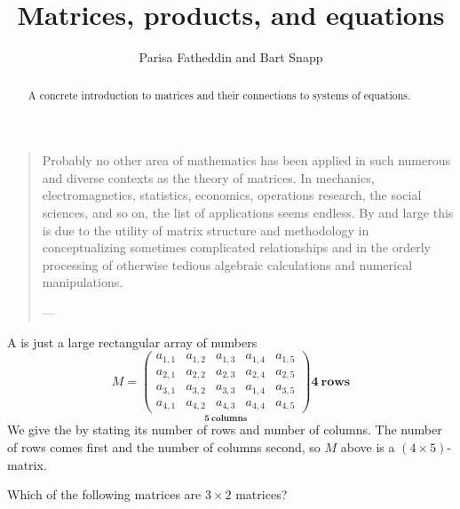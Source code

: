 \documentclass{ximera}
\author{Parisa Fatheddin and Bart Snapp}
\title{Matrices, products, and equations}
\begin{document}
\begin{abstract}
  A concrete introduction to matrices and their connections to systems
  of equations.
\end{abstract}
\maketitle

\begin{quote}
  Probably no other area of mathematics has been applied in such
  numerous and diverse contexts as the theory of matrices. In
  mechanics, electromagnetics, statistics, economics, operations
  research, the social sciences, and so on, the list of applications
  seems endless. By and large this is due to the utility of matrix
  structure and methodology in conceptualizing sometimes complicated
  relationships and in the orderly processing of otherwise tedious
  algebraic calculations and numerical manipulations.



  \hfill ---
\end{quote}




A  is just a large rectangular array of numbers
\[
M =
\underset{\displaystyle\boldsymbol{5}~\textbf{columns}}{\begin{pmatrix}
  a_{1,1} & a_{1,2} & a_{1,3} & a_{1,4} & a_{1,5} \\
  a_{2,1} & a_{2,2} & a_{2,3} & a_{2,4} & a_{2,5} \\
  a_{3,1} & a_{3,2} & a_{3,3} & a_{1,4} & a_{3,5} \\
  a_{4,1} & a_{4,2} & a_{4,3} & a_{4,4} & a_{4,5}
\end{pmatrix}}
\boldsymbol{4}~\textbf {rows}
\]
We give the  by stating its number of rows
and number of columns. The number of rows comes first and the number
of columns second, so $M$ above is a $(4\times 5)$-matrix.
\begin{question}
  Which of the following matrices are $3\times 2$ matrices?
  \begin{selectAll}
  \end{selectAll}
\end{question}
\end{document}

